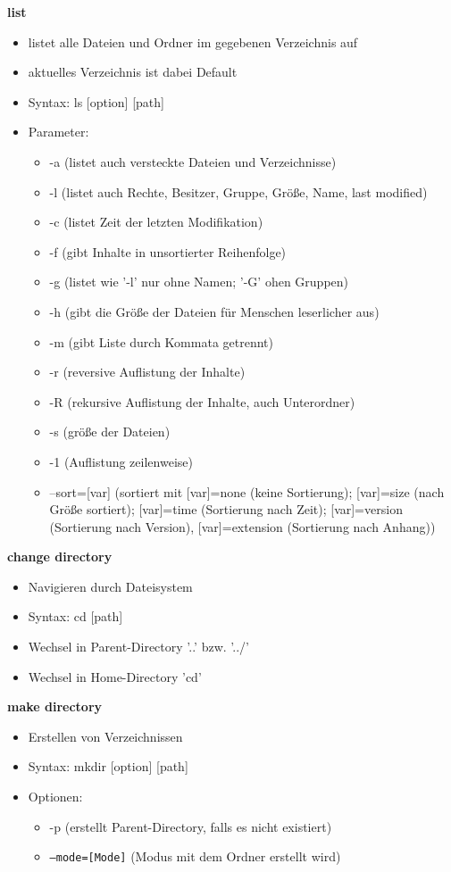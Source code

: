 \documentclass[12pt,utf8, 10pt]{article}
\begin{document}
\textbf{list}
\begin{itemize}
	\item listet alle Dateien und Ordner im gegebenen Verzeichnis auf
	\item aktuelles Verzeichnis ist dabei Default
	\item Syntax: ls [option] [path]
	\item Parameter:
	\begin{itemize}
		\item -a (listet auch versteckte Dateien und Verzeichnisse)
		\item -l (listet auch Rechte, Besitzer, Gruppe, Größe, Name, last modified)
		\item -c (listet Zeit der letzten Modifikation)
		\item -f (gibt Inhalte in unsortierter Reihenfolge)
		\item -g (listet wie '-l' nur ohne Namen; '-G' ohen Gruppen)
		\item -h (gibt die Größe der Dateien für Menschen leserlicher aus)
		\item -m (gibt Liste durch Kommata getrennt)
		\item -r (reversive Auflistung der Inhalte)
		\item -R (rekursive Auflistung der Inhalte, auch Unterordner)
		\item -s (größe der Dateien)
		\item -1 (Auflistung zeilenweise)
		\item --sort=[var] (sortiert mit [var]=none (keine Sortierung); [var]=size (nach Größe sortiert); [var]=time (Sortierung nach Zeit); [var]=version (Sortierung nach Version), [var]=extension (Sortierung nach Anhang))
	\end{itemize}
\end{itemize}

\textbf{change directory}
\begin{itemize}
	\item Navigieren durch Dateisystem
	\item Syntax: cd [path]
	\item Wechsel in Parent-Directory '..' bzw. '../'
	\item Wechsel in Home-Directory 'cd' 
\end{itemize}

\textbf{make directory}
\begin{itemize}
	\item Erstellen von Verzeichnissen
	\item Syntax: mkdir [option] [path]
	\item Optionen:
	\begin{itemize}
		\item -p (erstellt Parent-Directory, falls es nicht existiert)
		\item \texttt{--mode=[Mode]} (Modus mit dem Ordner erstellt wird)
	\end{itemize}
\end{itemize}
\end{document}

